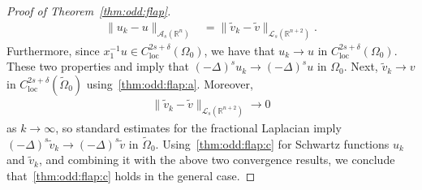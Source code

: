 \documentclass[a4paper,12pt,reqno]{amsart}
\numberwithin{equation}{section}
\theoremstyle{definition}
\theoremstyle{notation}
\newcommand{\R}{\mathds{R}}
\begin{document}
\begin{proof}[Proof of Theorem~\ref{thm:odd:flap}]
\begin{align*}
 \|u_k - u\|_{\mathscr A_s(\R^n)} & = \|\tilde v_k - \tilde v\|_{\mathscr L_s(\R^{n + 2})} .
\end{align*}
Furthermore, since \(x_1^{-1}u \in  C^{2s+\delta}_{\mathrm{loc}}(\Omega_0)\), we have that \(u_k \to u\) in \( C^{2s+\delta}_{\mathrm{loc}}(\Omega_0)\). These two properties and \cite[Lemma 2.3]{dtv} imply that \((-\Delta)^su_k \to (-\Delta)^su\) in \(\Omega_0\). Next, \(\tilde v_k \to v\) in \(C^{2s+\delta}_{\mathrm{loc}}(\tilde \Omega_0)\) using~\ref{thm:odd:flap:a}. Moreover,
\begin{align*}
 \| \tilde v_k - \tilde v\|_{\mathscr L_s(\R^{n+2})} \to 0
\end{align*}
as $k \to \infty$, so standard estimates for the fractional Laplacian imply \((-\Delta)^s\tilde v_k \to (-\Delta)^s\tilde v\) in \(\tilde \Omega_0\). Using~\ref{thm:odd:flap:c} for Schwartz functions $u_k$ and $\tilde v_k$, and combining it with the above two convergence results, we conclude that~\ref{thm:odd:flap:c} holds in the general case.



\end{proof}
\end{document}
